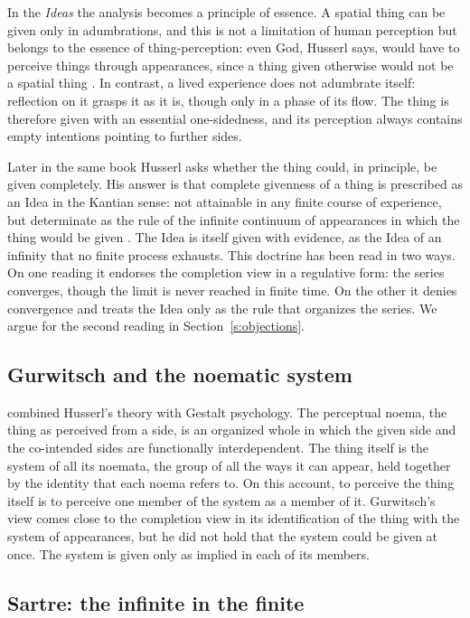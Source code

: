 \documentclass{situationist-preprint}
\begin{document}
In the \emph{Ideas} the analysis becomes a principle of essence. A spatial thing can be given only in adumbrations, and this is not a limitation of human perception but belongs to the essence of thing-perception: even God, Husserl says, would have to perceive things through appearances, since a thing given otherwise would not be a spatial thing \citep[§§42--44]{Husserl1913}. In contrast, a lived experience does not adumbrate itself: reflection on it grasps it as it is, though only in a phase of its flow. The thing is therefore given with an essential one-sidedness, and its perception always contains empty intentions pointing to further sides.

Later in the same book Husserl asks whether the thing could, in principle, be given completely. His answer is that complete givenness of a thing is prescribed as an Idea in the Kantian sense: not attainable in any finite course of experience, but determinate as the rule of the infinite continuum of appearances in which the thing would be given \citep[§§142--143]{Husserl1913}. The Idea is itself given with evidence, as the Idea of an infinity that no finite process exhausts. This doctrine has been read in two ways. On one reading it endorses the completion view in a regulative form: the series converges, though the limit is never reached in finite time. On the other it denies convergence and treats the Idea only as the rule that organizes the series. We argue for the second reading in Section~\ref{s:objections}.

\subsection{Gurwitsch and the noematic system}

\citet{Gurwitsch1964} combined Husserl's theory with Gestalt psychology. The perceptual noema, the thing as perceived from a side, is an organized whole in which the given side and the co-intended sides are functionally interdependent. The thing itself is the system of all its noemata, the group of all the ways it can appear, held together by the identity that each noema refers to. On this account, to perceive the thing itself is to perceive one member of the system as a member of it. Gurwitsch's view comes close to the completion view in its identification of the thing with the system of appearances, but he did not hold that the system could be given at once. The system is given only as implied in each of its members.

\subsection{Sartre: the infinite in the finite}
\end{document}

